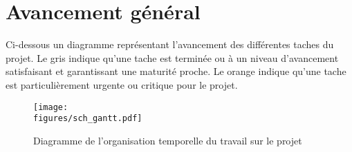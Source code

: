 \chapter{Avancement général}
\label{chapter1}

Ci-dessous un diagramme représentant l'avancement des différentes taches du projet. Le gris indique qu'une tache est terminée ou à un niveau d'avancement satisfaisant et garantissant une maturité proche. Le orange indique qu'une tache est particulièrement urgente ou critique pour le projet.

\begin{figure}[H]
    \centering
	\texttt{[image: \\figures/sch\_gantt.pdf]}
    \decoRule
    \caption[
    Diagramme de l'organisation temporelle du travail sur le projet]{
    Diagramme de l'organisation temporelle du travail sur le projet}
    \label{fig:Diagramme de l'organisation temporelle du travail sur le projet}
    \end{figure}



